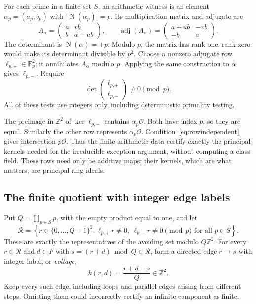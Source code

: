\documentclass[11pt]{article}
\numberwithin{equation}{section}
\theoremstyle{definition}\newtheorem{definition}[theorem]{Definition}
\theoremstyle{remark}\newtheorem{remark}[theorem]{Remark}
\newcommand{\Z}{\mathbb Z}\newcommand{\Q}{\mathbb Q}\newcommand{\R}{\mathbb R}
\newcommand{\F}{\mathbb F}\newcommand{\C}{\mathbb C}
\newcommand{\OO}{\mathcal O}\newcommand{\PP}{\mathcal P}
\newcommand{\abs}[1]{\lvert #1\rvert}
\newcommand{\N}{\operatorname{N}}
\begin{document}
For each prime in a finite set $S$, an arithmetic witness is an element $\alpha_p=(a_p,b_p)$ with $\abs{\N(\alpha_p)}=p$. Its multiplication matrix and adjugate are
\[
 A_\alpha=\begin{pmatrix}a&vb\\ b&a+ub\end{pmatrix},
 \qquad
 \operatorname{adj}(A_\alpha)=
 \begin{pmatrix}a+ub&-vb\\-b&a\end{pmatrix}.
\]
The determinant is $\N(\alpha)=\pm p$. Modulo $p$, the matrix has rank one: rank zero would make its determinant divisible by $p^2$. Choose a nonzero adjugate row $\ell_{p,+}\in\F_p^2$; it annihilates $A_\alpha$ modulo $p$. Applying the same construction to $\bar\alpha$ gives $\ell_{p,-}$. Require
\begin{equation}\label{eq:rowindependent}
 \det\begin{pmatrix}\ell_{p,+}\\\ell_{p,-}\end{pmatrix}\ne0\pmod p.
\end{equation}
All of these tests use integers only, including deterministic primality testing.

The preimage in $\Z^2$ of $\ker\ell_{p,+}$ contains $\alpha_p\OO$. Both have index $p$, so they are equal. Similarly the other row represents $\bar\alpha_p\OO$. Condition~\eqref{eq:rowindependent} gives intersection $p\OO$. Thus the finite arithmetic data certify exactly the principal kernels needed for the irreducible exception argument, without computing a class field. These rows need only be additive maps; their kernels, which are what matters, are principal ring ideals.

\subsection{The finite quotient with integer edge labels}

Put $Q=\prod_{p\in S}p$, with the empty product equal to one, and let
\[
 \mathcal R=\left\{r\in\{0,\ldots,Q-1\}^2:
 \ell_{p,+}r\ne0,\ \ell_{p,-}r\ne0\pmod p\text{ for all }p\in S\right\}.
\]
These are exactly the representatives of the avoiding set modulo $Q\Z^2$. For every $r\in\mathcal R$ and $d\in F$ with $s=(r+d)\bmod Q\in\mathcal R$, form a directed edge $r\to s$ with integer label, or \emph{voltage},
\begin{equation}\label{eq:voltage}
 k(r,d)=\frac{r+d-s}{Q}\in\Z^2.
\end{equation}
Keep every such edge, including loops and parallel edges arising from different steps. Omitting them could incorrectly certify an infinite component as finite.
\end{document}
